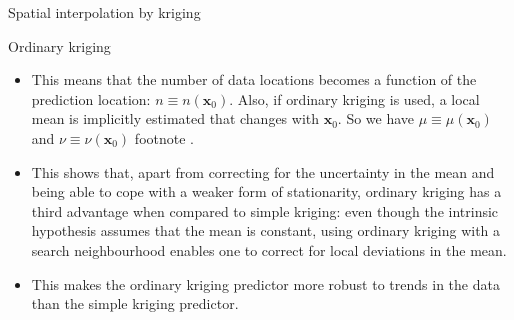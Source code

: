 \documentclass[8pt]{beamer}
\renewcommand{\emph}[1]{\textcolor{myorange}{#1}}
\begin{document}
 \begin{frame}{Spatial interpolation by kriging}
     \begin{block}{Ordinary kriging}
    \end{block}
    \begin{itemize}
        \item This means that the number of data locations becomes a function of the prediction location: $n \equiv n(\mathbf{x}_0)$. Also, if \emph{ordinary kriging} is used, a local mean is implicitly estimated that changes with $\mathbf{x}_0$. So we have $\mu \equiv \mu (\mathbf{x}_0)$  and $\nu \equiv \nu(\mathbf{x}_0)$ footnote .
        \item This shows that, apart from correcting for the uncertainty in the \emph{mean} and being able to cope with a weaker form of \emph{stationarity}, \emph{ordinary kriging} has a third advantage when compared to \emph{simple kriging}: even though the intrinsic hypothesis assumes that the \emph{mean} is constant, using \emph{ordinary kriging} with a search neighbourhood enables one to correct for \emph{local deviations} in the \emph{mean}.
        \item This makes the \emph{ordinary kriging predictor} more robust to \emph{trends} in the data than the \emph{simple kriging predictor}.

    \end{itemize}
   \end{frame}
\end{document}
